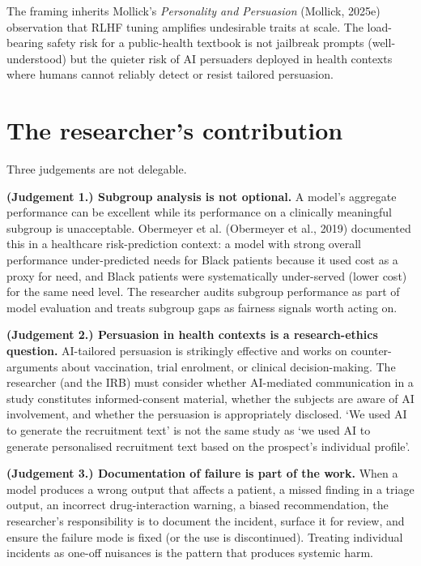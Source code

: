 \documentclass[
  letterpaper,
  11pt]{scrbook}
\begin{document}
The framing inherits Mollick's \emph{Personality and Persuasion}
(Mollick, 2025e) observation that RLHF tuning amplifies undesirable
traits at scale. The load-bearing safety risk for a public-health
textbook is not jailbreak prompts (well-understood) but the quieter risk
of AI persuaders deployed in health contexts where humans cannot
reliably detect or resist tailored persuasion.

\section{The researcher's contribution}\label{sec-safety-bias-human}

Three judgements are not delegable.

\textbf{(Judgement 1.) Subgroup analysis is not optional.} A model's
aggregate performance can be excellent while its performance on a
clinically meaningful subgroup is unacceptable. Obermeyer et al.
(Obermeyer et al., 2019) documented this in a healthcare risk-prediction
context: a model with strong overall performance under-predicted needs
for Black patients because it used cost as a proxy for need, and Black
patients were systematically under-served (lower cost) for the same need
level. The researcher audits subgroup performance as part of model
evaluation and treats subgroup gaps as fairness signals worth acting on.

\textbf{(Judgement 2.) Persuasion in health contexts is a
research-ethics question.} AI-tailored persuasion is strikingly
effective and works on counter-arguments about vaccination, trial
enrolment, or clinical decision-making. The researcher (and the IRB)
must consider whether AI-mediated communication in a study constitutes
informed-consent material, whether the subjects are aware of AI
involvement, and whether the persuasion is appropriately disclosed. `We
used AI to generate the recruitment text' is not the same study as `we
used AI to generate personalised recruitment text based on the
prospect's individual profile'.

\textbf{(Judgement 3.) Documentation of failure is part of the work.}
When a model produces a wrong output that affects a patient, a missed
finding in a triage output, an incorrect drug-interaction warning, a
biased recommendation, the researcher's responsibility is to document
the incident, surface it for review, and ensure the failure mode is
fixed (or the use is discontinued). Treating individual incidents as
one-off nuisances is the pattern that produces systemic harm.
\end{document}

